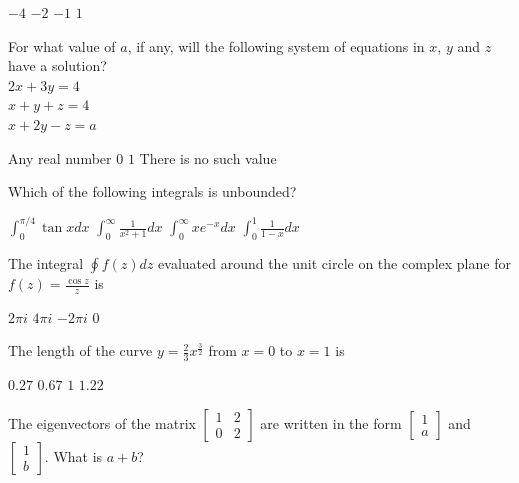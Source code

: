 \documentclass[addpoints,10pt]{exam}
\begin{document}
\begin{questions}
    \begin{oneparchoices}
        \choice $-4$
        \choice $-2$
        \choice $-1$
        \choice $1$
    \end{oneparchoices}
    \question For what value of $a$, if any, will the following system of equations in $x$, $y$ and $z$ have a solution?\\
    $2x+3y=4$\\$x+y+z=4$\\$x+2y-z=a$

    \begin{oneparchoices}
        \choice Any real number
        \choice $0$
        \choice $1$
        \choice There is no such value
    \end{oneparchoices}
    \question Which of the following integrals is unbounded?

    \begin{oneparchoices}
        \choice $\int_{0}^{\pi/4}{\tan x dx}$
        \choice $\int_{0}^{\infty}{\frac{1}{x^2+1} dx}$
        \choice $\int_{0}^{\infty}{xe^{-x} dx}$
        \choice $\int_{0}^{1}{\frac{1}{1-x} dx}$
    \end{oneparchoices}
    
    \question The integral $\oint{f(z)dz}$ evaluated around the unit circle on the complex plane for $f(z) = \frac{\cos z}{z}$ is

    \begin{oneparchoices}
        \choice $2\pi i$
        \choice $4\pi i$
        \choice $-2\pi i$
        \choice $0$
    \end{oneparchoices}

    \question The length of the curve $y=\frac{2}{3}x^{\frac{3}{2}}$ from $x=0$ to $x=1$ is

    \begin{oneparchoices}
        \choice $0.27$
        \choice $0.67$
        \choice $1$
        \choice $1.22$
    \end{oneparchoices}

    \question The eigenvectors of the matrix $\begin{bmatrix}
            1 & 2 \\
            0 & 2
        \end{bmatrix}$ are written in the form $\begin{bmatrix}
            1 \\
            a
        \end{bmatrix}$ and $\begin{bmatrix}
            1\\b
        \end{bmatrix}$. What is $a+b$?


\end{questions}
\end{document}
